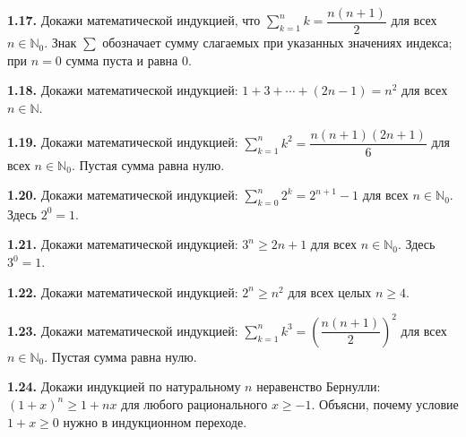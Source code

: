 \noindent\begin{minipage}[t]{\linewidth}\textbf{1.17.} Докажи математической индукцией, что \(\sum_{k=1}^{n}k=\dfrac{n(n+1)}2\) для всех \(n\in\mathbb N_0\). Знак \(\sum\) обозначает сумму слагаемых при указанных значениях индекса; при \(n=0\) сумма пуста и равна \(0\).\par\end{minipage}\par
\noindent\begin{minipage}[t]{\linewidth}\textbf{1.18.} Докажи математической индукцией: \(1+3+\cdots+(2n-1)=n^2\) для всех \(n\in\mathbb N\).\par\end{minipage}\par
\noindent\begin{minipage}[t]{\linewidth}\textbf{1.19.}\starmark{} Докажи математической индукцией: \(\sum_{k=1}^{n}k^2=\dfrac{n(n+1)(2n+1)}6\) для всех \(n\in\mathbb N_0\). Пустая сумма равна нулю.\par\end{minipage}\par
\noindent\begin{minipage}[t]{\linewidth}\textbf{1.20.} Докажи математической индукцией: \(\sum_{k=0}^{n}2^k=2^{n+1}-1\) для всех \(n\in\mathbb N_0\). Здесь \(2^0=1\).\par\end{minipage}\par
\noindent\begin{minipage}[t]{\linewidth}\textbf{1.21.} Докажи математической индукцией: \(3^n\ge2n+1\) для всех \(n\in\mathbb N_0\). Здесь \(3^0=1\).\par\end{minipage}\par
\noindent\begin{minipage}[t]{\linewidth}\textbf{1.22.} Докажи математической индукцией: \(2^n\ge n^2\) для всех целых \(n\ge4\).\par\end{minipage}\par
\noindent\begin{minipage}[t]{\linewidth}\textbf{1.23.}\starmark{} Докажи математической индукцией: \(\sum_{k=1}^{n}k^3=\left(\dfrac{n(n+1)}2\right)^2\) для всех \(n\in\mathbb N_0\). Пустая сумма равна нулю.\par\end{minipage}\par
\noindent\begin{minipage}[t]{\linewidth}\textbf{1.24.}\starmark{} Докажи индукцией по натуральному \(n\) неравенство Бернулли: \((1+x)^n\ge1+nx\) для любого рационального \(x\ge-1\). Объясни, почему условие \(1+x\ge0\) нужно в индукционном переходе.\par\end{minipage}\par

